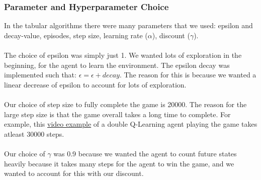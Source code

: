 \documentclass[twoside,11pt]{article}
\begin{document}
\subsubsection{Parameter and Hyperparameter Choice}
In the tabular algorithms there were many parameters that we used: epsilon and decay-value, episodes, step size, learning rate ($\alpha$),  discount ($\gamma$).
\\\\
The choice of epsilon was simply just 1. We wanted lots of exploration in the beginning, for the agent to learn the environment. The epsilon decay was implemented such that: $\epsilon = \epsilon + decay$. The reason for this is because we wanted a linear decrease of epsilon to account for lots of exploration. 
\\\\
Our choice of step size to fully complete the game is 20000. The reason for the large step size is that the game overall takes a long time to complete. For example, this \href{https://github.com/duoduocai-dot/csc498-project/blob/main/tabular_double_q_learning_example.mkv}{video example} of a double Q-Learning agent playing the game takes atleast 30000 steps.
\\\\
Our choice of $\gamma$ was 0.9 because we wanted the agent to count future states heavily because it takes many steps for the agent to win the game, and we wanted to account for this with our discount.
\end{document}
